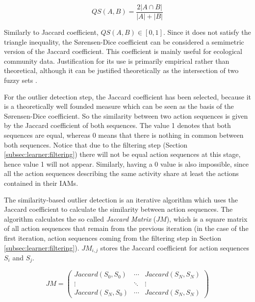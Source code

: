 \begin{equation}
 QS(A, B) = \frac{2 |A \cap B|}{|A| + |B|}
\end{equation}

Similarly to Jaccard coefficient, $QS(A, B) \in [0, 1]$. Since it does not satisfy the triangle inequality, the S{\o}rensen-Dice coefficient can be considered a semimetric version of the Jaccard coefficient. This coefficient is mainly useful for ecological community data. Justification for its use is primarily empirical rather than theoretical, although it can be justified theoretically as the intersection of two fuzzy sets \cite{Roberts1986}. 

For the outlier detection step, the Jaccard coefficient has been selected, because it is a theoretically well founded measure which can be seen as the basis of the S{\o}rensen-Dice coefficient. So the similarity between two action sequences is given by the Jaccard coefficient of both sequences. The value 1 denotes that both sequences are equal, whereas 0 means that there is nothing in common between both sequences. Notice that due to the filtering step (Section \ref{subsec:learner:filtering}) there will not be equal action sequences at this stage, hence value 1 will not appear. Similarly, having a 0 value is also impossible, since all the action sequences describing the same activity share at least the actions contained in their IAMs. 

The similarity-based outlier detection is an iterative algorithm which uses the Jaccard coefficient to calculate the similarity between action sequences. The algorithm calculates the so called \textit{Jaccard Matrix} ($JM$), which is a square matrix of all action sequences that remain from the previous iteration (in the case of the first iteration, action sequences coming from the filtering step in Section \ref{subsec:learner:filtering}). $JM_{i, j}$ stores the Jaccard coefficient for action sequences $S_i$ and $S_j$. 

\begin{equation}
JM = \left(
\begin{array}{ccc}
 Jaccard(S_0, S_0) & \cdots & Jaccard(S_N,S_N) \\
 \vdots & \ddots & \vdots \\
 Jaccard(S_N,S_0) & \cdots & Jaccard(S_N,S_N) 
\end{array}
\right)
\end{equation}

